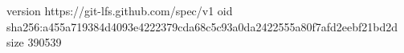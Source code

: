 version https://git-lfs.github.com/spec/v1
oid sha256:a455a719384d4093e4222379cda68c5c93a0da2422555a80f7afd2eebf21bd2d
size 390539
